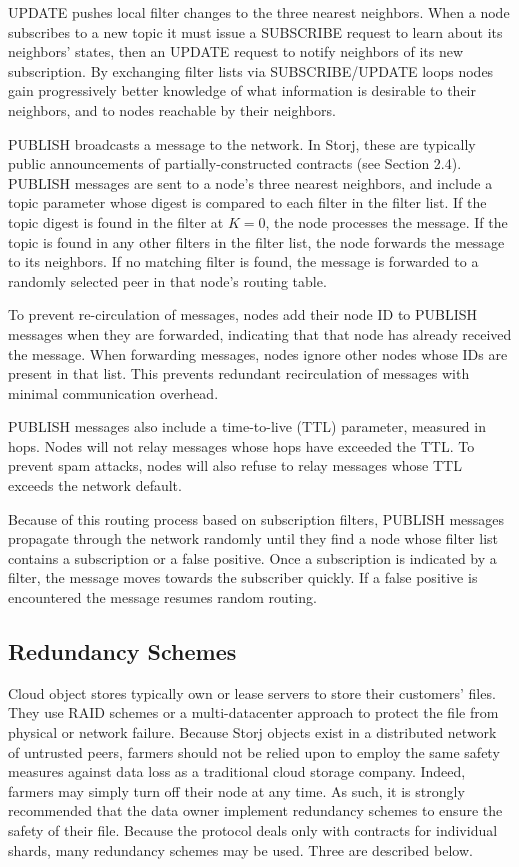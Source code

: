 \documentclass[a4paper,10pt]{article}
\begin{document}
UPDATE pushes local filter changes to the three nearest neighbors. When a node subscribes to a new topic it must issue a SUBSCRIBE request to learn about its neighbors’ states, then an UPDATE request to notify neighbors of its new subscription. By exchanging filter lists via SUBSCRIBE/UPDATE loops nodes gain progressively better knowledge of what information is desirable to their neighbors, and to nodes reachable by their neighbors.

PUBLISH broadcasts a message to the network. In Storj, these are typically public announcements of partially-constructed contracts (see Section 2.4). PUBLISH messages are sent to a node’s three nearest neighbors, and include a topic parameter whose digest is compared to each filter in the filter list. If the topic digest is found in the filter at $ K = 0 $, the node processes the message. If the topic is found in any other filters in the filter list, the node forwards the message to its neighbors. If no matching filter is found, the message is forwarded to a randomly selected peer in that node’s routing table.

To prevent re-circulation of messages, nodes add their node ID to PUBLISH messages when they are forwarded, indicating that that node has already received the message. When forwarding messages, nodes ignore other nodes whose IDs are present in that list. This prevents redundant recirculation of messages with minimal communication overhead.

PUBLISH messages also include a time-to-live (TTL) parameter, measured in hops. Nodes will not relay messages whose hops have exceeded the TTL. To prevent spam attacks, nodes will also refuse to relay messages whose TTL exceeds the network default.

Because of this routing process based on subscription filters, PUBLISH messages propagate through the network randomly until they find a node whose filter list contains a subscription or a false positive. Once a subscription is indicated by a filter, the message moves towards the subscriber quickly. If a false positive is encountered the message resumes random routing.

\subsection{Redundancy Schemes}
Cloud object stores typically own or lease servers to store their customers’ files. They use RAID schemes or a multi-datacenter approach to protect the file from physical or network failure. Because Storj objects exist in a distributed network of untrusted peers, farmers should not be relied upon to employ the same safety measures against data loss as a traditional cloud storage company. Indeed, farmers may simply turn off their node at any time. As such, it is strongly recommended that the data owner implement redundancy schemes to ensure the safety of their file. Because the protocol deals only with contracts for individual shards, many redundancy schemes may be used. Three are described below.
\end{document}
